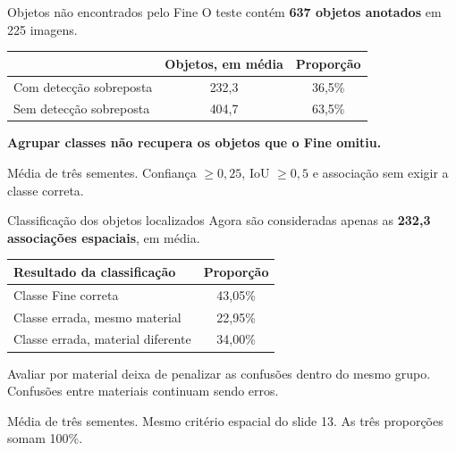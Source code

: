 \documentclass[aspectratio=169,10pt]{beamer}
\begin{document}
\begin{frame}{Objetos não encontrados pelo Fine}
  \vspace{0.12cm}
  {\fontsize{12.3}{15.6}\selectfont O teste contém \textbf{637 objetos anotados} em 225 imagens.}\par
  \vspace{0.27cm}
  \centering
  \renewcommand{\arraystretch}{1.20}
  {\fontsize{12.3}{15.6}\selectfont
  \begin{tabular}{lcc}
    \toprule
     & \textbf{Objetos, em média} & \textbf{Proporção} \\
    \midrule
    Com detecção sobreposta & 232,3 & 36,5\% \\
    Sem detecção sobreposta & 404,7 & 63,5\% \\
    \bottomrule
  \end{tabular}}\par
  \vspace{0.24cm}
  \raggedright
  {\color{ufpidark}\fontsize{12.3}{15.6}\selectfont\bfseries Agrupar classes não recupera os objetos que o Fine omitiu.}\par
  \vspace{0.15cm}
  {\color{muted}\fontsize{8.2}{10.7}\selectfont Média de três sementes. Confiança $\geq0{,}25$, IoU $\geq0{,}5$ e associação sem exigir a classe correta.}
\end{frame}

\begin{frame}{Classificação dos objetos localizados}
  \vspace{0.15cm}
  {\fontsize{11.5}{14.8}\selectfont Agora são consideradas apenas as \textbf{232,3 associações espaciais}, em média.}\par
  \vspace{0.18cm}
  \centering
  \renewcommand{\arraystretch}{1.20}
  {\fontsize{11.5}{14.8}\selectfont
  \begin{tabular}{lc}
    \toprule
    \textbf{Resultado da classificação} & \textbf{Proporção} \\
    \midrule
    Classe Fine correta & 43,05\% \\
    Classe errada, mesmo material & 22,95\% \\
    Classe errada, material diferente & 34,00\% \\
    \bottomrule
  \end{tabular}}\par
  \vspace{0.24cm}
  \raggedright
  {\fontsize{11.5}{14.8}\selectfont Avaliar por material deixa de penalizar as confusões dentro do mesmo grupo. Confusões entre materiais continuam sendo erros.}\par
  \vspace{0.12cm}
  {\color{muted}\fontsize{8.2}{10.7}\selectfont Média de três sementes. Mesmo critério espacial do slide 13. As três proporções somam 100\%.}
\end{frame}
\end{document}
